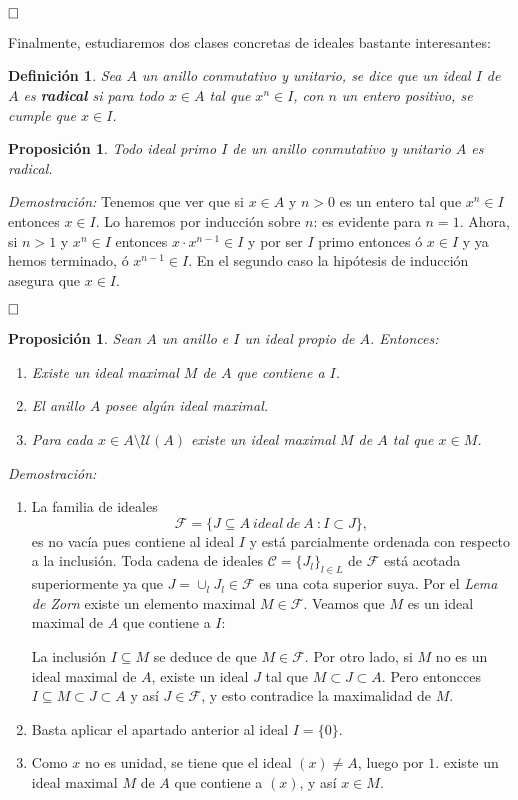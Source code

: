 \documentclass[12pt]{article}
\newtheorem{proposition}[theorem]{Proposición}
\newtheorem{definition}[theorem]{Definición}
\begin{document}
$\hfill \square$

Finalmente, estudiaremos dos clases concretas de ideales bastante interesantes: 

\begin{definition}Sea $A$ un anillo conmutativo y unitario, se dice que un ideal $I$ de $A$ es \textbf{radical} si para todo $x \in A$ tal que $x^n \in I$, con $n$ un entero positivo, se cumple que $x \in I$.
\end{definition}

\begin{proposition}Todo ideal primo $I$ de un anillo conmutativo y unitario $A$ es radical.
\end{proposition}
\emph{Demostración: }Tenemos que ver que si $x \in A$ y $n>0$ es un entero tal que $x^n \in I$ entonces $x \in I$. Lo haremos por inducción sobre $n$: es evidente para $n=1$. Ahora, si $n>1$ y $x^n \in I$ entonces $x \cdot x^{n-1} \in I$ y por ser $I$ primo entonces ó $x \in I$ y ya hemos terminado, ó $x^{n-1} \in I$. En el segundo caso la hipótesis de inducción asegura que $x \in I$.

$\hfill \square$

\begin{proposition}Sean $A$ un anillo e $I$ un ideal propio de $A$. Entonces:
\begin{enumerate}
\item Existe un ideal maximal $M$ de $A$ que contiene a $I$.
\item El anillo $A$ posee algún ideal maximal.
\item Para cada $x \in A \setminus \mathcal{U}(A)$ existe un ideal maximal $M$ de $A$ tal que $x \in M$.
\end{enumerate} 
\end{proposition}
\emph{Demostración: }\begin{enumerate}
\item La familia de ideales $$\mathcal{F} = \lbrace J \subseteq A~ideal~de~A~:I \subset J \rbrace,$$  es no vacía pues contiene al ideal $I$ y está parcialmente ordenada con respecto a la inclusión. Toda cadena de ideales $\mathcal{C} = \lbrace J_l \rbrace_{l \in L}$ de $\mathcal{F}$ está acotada superiormente ya que $J = \cup_l J_l \in \mathcal{F}$ es una cota superior suya. Por el \textit{Lema de Zorn} existe un elemento maximal $M \in \mathcal{F}$. Veamos que $M$ es un ideal maximal de $A$ que contiene a $I$:

La inclusión $I \subseteq M$ se deduce de que $M \in \mathcal{F}$. Por otro lado, si $M$ no es un ideal maximal de $A$, existe un ideal $J$ tal que $M \subset J \subset A$. Pero entoncces $I \subseteq M \subset J \subset A$ y así $J \in \mathcal{F}$, y esto contradice la maximalidad de $M$.
\item Basta aplicar el apartado anterior al ideal $I = \lbrace 0 \rbrace$.
\item Como $x$ no es unidad, se tiene que el ideal $(x) \neq A$, luego por $1.$ existe un ideal maximal $M$ de $A$ que contiene a $(x)$, y así $x \in M$.
\end{enumerate}
\end{document}

